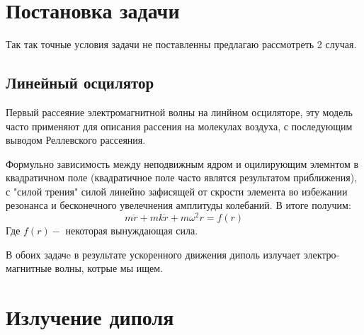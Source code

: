 \documentclass[a4paper]{article}
\numberwithin{equation}{section}
\begin{document}
\tableofcontents
{}
\pagestyle{main}



\section{Постановка задачи}

Так так точные условия задачи не поставленны предлагаю рассмотреть 2 случая.

\subsection{Линейный осцилятор}
Первый рассеяние электромагнитной волны на линйном осциляторе, эту модель 
часто применяют для описания рассения на молекулах воздуха, с последующим 
выводом Реллевского рассеяния. 

Формульно зависимость между неподвижным ядром и оцилирующим элемнтом 
в квадратичном поле (квадратичное поле часто являтся результатом приближения), 
с "силой трения" силой линейно зафисящей от скрости элемента во избежании 
резонанса и бесконечного увелечнения амплитуды колебаний. В итоге получим:
\begin{equation}
    m\ddot r + mk \dot r + m\omega^2 r = f(r)
\end{equation}
Где $f(r)-$ некоторая вынуждающая сила.

В обоих задачe в результате ускоренного движения диполь излучает 
электро-магнитные волны, котрые мы ищем.


\section{Излучение диполя}
\end{document}
